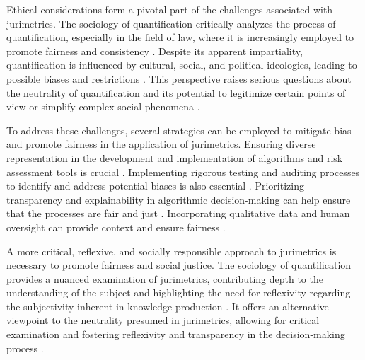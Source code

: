 Ethical considerations form a pivotal part of the challenges associated with jurimetrics. The sociology of quantification critically analyzes the process of quantification, especially in the field of law, where it is increasingly employed to promote fairness and consistency \cite{10.1057/s41599-020-00557-0, de2010jurimetrics}. Despite its apparent impartiality, quantification is influenced by cultural, social, and political ideologies, leading to possible biases and restrictions \cite{10.1177/09596801221075807, de2010jurimetrics}. This perspective raises serious questions about the neutrality of quantification and its potential to legitimize certain points of view or simplify complex social phenomena \cite{10.1111/ilr.12067, de2010jurimetrics}.

To address these challenges, several strategies can be employed to mitigate bias and promote fairness in the application of jurimetrics. Ensuring diverse representation in the development and implementation of algorithms and risk assessment tools is crucial \cite{10.1590/data.2022.65.3.267,10.32586/rcda.v18i1.585}. Implementing rigorous testing and auditing processes to identify and address potential biases is also essential \cite{10.1590/data.2022.65.3.267,10.32586/rcda.v18i1.585}. Prioritizing transparency and explainability in algorithmic decision-making can help ensure that the processes are fair and just \cite{10.1590/data.2022.65.3.267,10.32586/rcda.v18i1.585}. Incorporating qualitative data and human oversight can provide context and ensure fairness \cite{10.1590/data.2022.65.3.267,10.32586/rcda.v18i1.585}.

A more critical, reflexive, and socially responsible approach to jurimetrics is necessary to promote fairness and social justice. The sociology of quantification provides a nuanced examination of jurimetrics, contributing depth to the understanding of the subject and highlighting the need for reflexivity regarding the subjectivity inherent in knowledge production \cite{10.1590/data.2022.65.3.267,10.32586/rcda.v18i1.585}. It offers an alternative viewpoint to the neutrality presumed in jurimetrics, allowing for critical examination and fostering reflexivity and transparency in the decision-making process \cite{10.1590/data.2022.65.3.267,10.32586/rcda.v18i1.585}.


